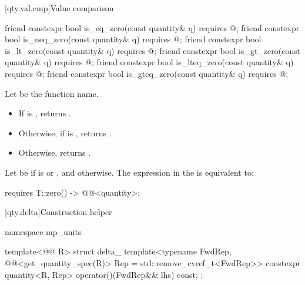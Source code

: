 [qty.val.cmp]{Value comparison}

\begin{itemdecl}
friend constexpr bool is_eq_zero(const quantity& q) requires @\seebelownc@;
friend constexpr bool is_neq_zero(const quantity& q) requires @\seebelownc@;
friend constexpr bool is_lt_zero(const quantity& q) requires @\seebelownc@;
friend constexpr bool is_gt_zero(const quantity& q) requires @\seebelownc@;
friend constexpr bool is_lteq_zero(const quantity& q) requires @\seebelownc@;
friend constexpr bool is_gteq_zero(const quantity& q) requires @\seebelownc@;
\end{itemdecl}

\begin{itemdescr}
\pnum
Let  be the function name.

\pnum
\returns
\begin{itemize}
\item
If  is , returns .
\item
Otherwise, if  is , returns .
\item
Otherwise, returns .
\end{itemize}

\pnum
\remarks
Let  be
 if  is  or , and
 otherwise.
The expression in the  is equivalent to:
\begin{codeblock}
requires {
  { T::zero() } -> @@<quantity>;
}
\end{codeblock}
\end{itemdescr}

[qty.delta]{Construction helper }

\begin{codeblock}
namespace mp_units {

template<@@ R>
struct delta_ {
  template<typename FwdRep,
           @@<get_quantity_spec(R{})> Rep = std::remove_cvref_t<FwdRep>>
  constexpr quantity<R{}, Rep> operator()(FwdRep&& lhs) const;
};

}
\end{codeblock}

